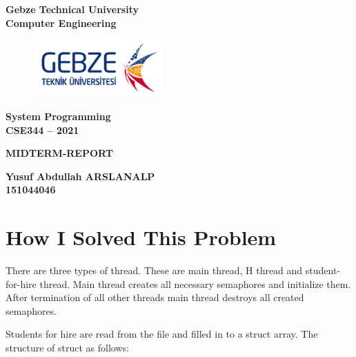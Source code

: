 \documentclass[10pt,english, openany]{book}
\begin{document}


\mainmatter


\begin{centering}

	{\LARGE \textbf{Gebze Technical University}} \\
	{\LARGE \textbf{Computer Engineering}} \\
	    \vspace{2.0cm}
	    
\begin{figure}[htp]
    \centering
    \includegraphics[width=5cm]{gtu_logo.png}
    
\end{figure}	    
	    
	    \vspace{2.0cm}
	    
	{\LARGE \textbf{System Programming}} \\
	{\LARGE \textbf{CSE344 – 2021}} \\
	    \vspace{3.0cm}
	
	{\LARGE \textbf{MIDTERM-REPORT}} \\
		\vspace{3.0cm}

	{\LARGE \textbf{Yusuf Abdullah ARSLANALP}} \\
	{\LARGE \textbf{151044046}} \\


\end{centering}



\newpage


\section{How I Solved This Problem}
There are three types of thread. These are main thread, H thread and student-for-hire thread. Main thread creates all necessary semaphores and initialize them. After termination of all other threads main thread destroys all created semaphores.

Students for hire are read from the file and filled in to a struct array. The structure of struct as follows:
\end{document}
